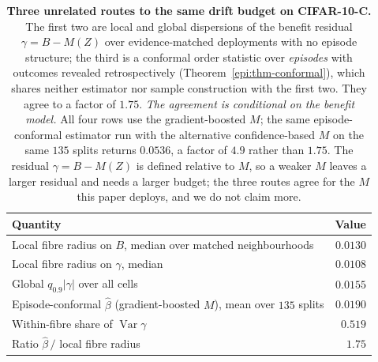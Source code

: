 \begin{table}[t]\centering\footnotesize
\caption{\textbf{Three unrelated routes to the same drift budget on CIFAR-10-C.} The first two are
local and global dispersions of the benefit residual $\gamma=B-M(Z)$ over evidence-matched
deployments with no episode structure; the third is a conformal order statistic over \emph{episodes}
with outcomes revealed retrospectively (Theorem~\ref{epi:thm-conformal}), which shares neither
estimator nor sample construction with the first two. They agree to a factor of $1.75$.
\emph{The agreement is conditional on the benefit model.} All four rows use the gradient-boosted
$M$; the same episode-conformal estimator run with the alternative confidence-based $M$ on the same
$135$ splits returns $0.0536$, a factor of $4.9$ rather than $1.75$. The residual $\gamma=B-M(Z)$ is
defined relative to $M$, so a weaker $M$ leaves a larger residual and needs a larger budget; the
three routes agree for the $M$ this paper deploys, and we do not claim more.}
\label{tab:necessity-band}
\begin{tabular}{@{}lr@{}}
\toprule
Quantity & Value \\
\midrule
Local fibre radius on $B$, median over matched neighbourhoods & $0.0130$ \\
Local fibre radius on $\gamma$, median & $0.0108$ \\
Global $q_{0.9}|\gamma|$ over all cells & $0.0155$ \\
Episode-conformal $\widehat\beta$ (gradient-boosted $M$), mean over $135$ splits & $0.0190$ \\
\midrule
Within-fibre share of $\operatorname{Var}\gamma$ & $0.519$ \\
Ratio $\widehat\beta\,/$ local fibre radius & $1.75$ \\
\bottomrule
\end{tabular}
\end{table}

